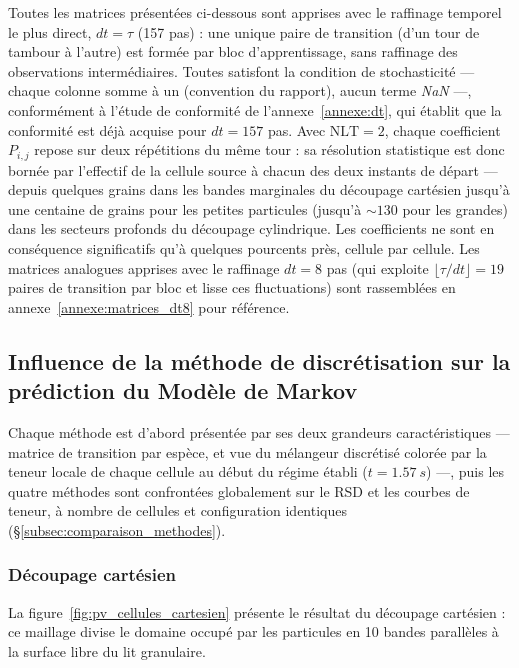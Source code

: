 \documentclass[french]{MemoireMaster}
\begin{document}
Toutes les matrices présentées ci-dessous sont apprises avec le raffinage temporel le plus direct, $dt = \tau$ (157 pas) : une unique paire de transition (d'un tour de tambour à l'autre) est formée par bloc d'apprentissage, sans raffinage des observations intermédiaires. Toutes satisfont la condition de stochasticité --- chaque colonne somme à un (convention du rapport), aucun terme \textit{NaN} ---, conformément à l'étude de conformité de l'annexe~\ref{annexe:dt}, qui établit que la conformité est déjà acquise pour $dt = 157$ pas. Avec $\mathrm{NLT} = 2$, chaque coefficient $P_{i,j}$ repose sur deux répétitions du même tour : sa résolution statistique est donc bornée par l'effectif de la cellule source à chacun des deux instants de départ --- depuis quelques grains dans les bandes marginales du découpage cartésien jusqu'à une centaine de grains pour les petites particules (jusqu'à $\sim 130$ pour les grandes) dans les secteurs profonds du découpage cylindrique. Les coefficients ne sont en conséquence significatifs qu'à quelques pourcents près, cellule par cellule. Les matrices analogues apprises avec le raffinage $dt = 8$ pas (qui exploite $\lfloor \tau/dt \rfloor = 19$ paires de transition par bloc et lisse ces fluctuations) sont rassemblées en annexe~\ref{annexe:matrices_dt8} pour référence.

\subsection{Influence de la méthode de discrétisation sur la prédiction du Modèle de Markov}
\label{subsec:res_discretisation}

Chaque méthode est d'abord présentée par ses deux grandeurs caractéristiques --- matrice de transition par espèce, et vue du mélangeur discrétisé colorée par la teneur locale de chaque cellule au début du régime établi ($t = \SI{1.57}{s}$) ---, puis les quatre méthodes sont confrontées globalement sur le RSD et les courbes de teneur, à nombre de cellules et configuration identiques (\S\ref{subsec:comparaison_methodes}).

\subsubsection{Découpage cartésien}

La figure~\ref{fig:pv_cellules_cartesien} présente le résultat du découpage cartésien : ce maillage divise le domaine occupé par les particules en 10 bandes parallèles à la surface libre du lit granulaire.
\end{document}

